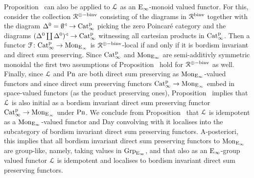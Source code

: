 \begin{variant}
Proposition~ can also be applied to $\operatorname{\mathcal{L}}$ as an ${\mathrm{E}_{\infty}}$-monoid valued functor. For this, consider the collection $\mathcal{R}^{\oplus-\mathrm{binv}}$ consisting of the diagrams in $\mathcal{R}^{\mathrm{binv}}$ together with the diagram $\Delta^0 = \emptyset^{\triangleleft}\to \mathrm{Cat}^{\mathrm p}_\infty$ picking the zero Poincaré category and the diagrams $(\Delta^0 \coprod \Delta^0)^{\triangleleft} \to \mathrm{Cat}^{\mathrm p}_\infty$ witnessing all cartesian products in $\mathrm{Cat}^{\mathrm p}_\infty$. Then a functor $\mathcal{F}\colon \mathrm{Cat}^{\mathrm p}_\infty \to \operatorname{Mon}_{{\mathrm{E}_{\infty}}}$ is $\mathcal{R}^{\oplus-\mathrm{binv}}$-local if and only if it is bordism invariant and direct sum preserving. Since $\mathrm{Cat}^{\mathrm p}_\infty$ and $\operatorname{Mon}_{{\mathrm{E}_{\infty}}}$ are semi-additivly symmetric monoidal the first two assumptions of Proposition~ hold for $\mathcal{R}^{\oplus-\mathrm{binv}}$ as well. Finally, since $\operatorname{\mathcal{L}}$ and $\mathrm{Pn}$ are both direct sum preserving as $\operatorname{Mon}_{{\mathrm{E}_{\infty}}}$-valued functors and since direct sum preserving functors $\mathrm{Cat}^{\mathrm p}_\infty \to \operatorname{Mon}_{{\mathrm{E}_{\infty}}}$ embed in space-valued functors (as the product preserving ones), Proposition~ implies that $\operatorname{\mathcal{L}}$ is also initial as a bordism invariant direct sum preserving functor $\mathrm{Cat}^{\mathrm p}_\infty \to \operatorname{Mon}_{{\mathrm{E}_{\infty}}}$ under $\mathrm{Pn}$.
We conclude from Proposition~ that $\operatorname{\mathcal{L}}$ is idempotent as a $\operatorname{Mon}_{{\mathrm{E}_{\infty}}}$-valued functor and Day convolving with it localises into the subcategory of bordism invariant direct sum preserving functors. A-posteriori, this implies that all bordism invariant direct sum preserving functors to $\operatorname{Mon}_{{\mathrm{E}_{\infty}}}$ are group-like, namely, taking values in $\operatorname{Grp}_{{\mathrm{E}_{\infty}}}$, and that also as an ${\mathrm{E}_{\infty}}$-group valued functor $\operatorname{\mathcal{L}}$ is idempotent and localises to bordism invariant direct sum preserving functors.
\end{variant}

